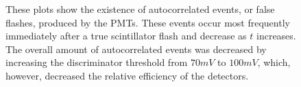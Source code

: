 \begin{figure}[h]
\begin{center}
\hspace{-7mm}
\vspace{-2mm}
\vspace{-2mm}
\vspace{-2mm}
\caption{These plots show the existence of autocorrelated events, or false flashes, produced by the PMTs.  These events occur most frequently immediately after a true scintillator flash and decrease as $t$ increases.  The overall amount of autocorrelated events was decreased by increasing the discriminator threshold from $70mV$ to $100 mV$, which, however, decreased the relative efficiency of the detectors.}
\label{fig:autocorr}
\end{center}
\end{figure}

